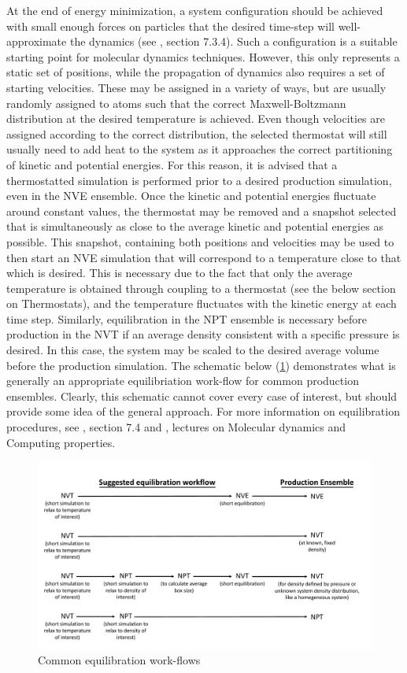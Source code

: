\documentclass[9pt,bestpractices]{livecoms}
\begin{document}
At the end of energy minimization, a system configuration should be achieved with small enough forces on particles that the desired time-step will well-approximate the dynamics (see \citet{LeachBook}, section 7.3.4). 
Such a configuration is a suitable starting point for molecular dynamics techniques. 
However, this only represents a static set of positions, while the propagation of dynamics also requires a set of starting velocities. 
These may be assigned in a variety of ways, but are usually randomly assigned to atoms such that the correct Maxwell-Boltzmann distribution at the desired temperature is achieved. 
Even though velocities are assigned according to the correct distribution, the selected thermostat will still usually need to add heat to the system as it approaches the correct partitioning of kinetic and potential energies. 
For this reason, it is advised that a thermostatted simulation is performed prior to a desired production simulation, even in the NVE ensemble. 
Once the kinetic and potential energies fluctuate around constant values, the thermostat may be removed and a snapshot selected that is simultaneously as close to the average kinetic and potential energies as possible. 
This snapshot, containing both positions and velocities may be used to then start an NVE simulation that will correspond to a temperature close to that which is desired. 
This is necessary due to the fact that only the average temperature is obtained through coupling to a thermostat (see the below section on Thermostats), and the temperature fluctuates with the kinetic energy at each time step. 
Similarly, equilibration in the NPT ensemble is necessary before production in the NVT if an average density consistent with a specific pressure is desired. 
In this case, the system may be scaled to the desired average volume before the production simulation. 
The schematic below (\ref{eqworkflow}) demonstrates what is generally an appropriate equilibriation work-flow for common production ensembles. 
Clearly, this schematic cannot cover every case of interest, but should provide some idea of the general approach.
For more information on equilibration procedures, see \citet{LeachBook}, section 7.4 and \citet{ShellNotes}, lectures on Molecular dynamics and Computing properties. 

\begin{figure}[h]
\centering
\includegraphics[width=\linewidth]{Equilibration_Workflow.pdf}
\caption{Common equilibration work-flows}
\label{eqworkflow}
\end{figure}
\end{document}
